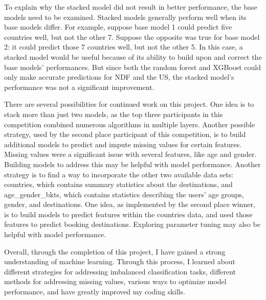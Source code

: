 \documentclass{article}
\begin{document}
To explain why the stacked model did not result in better performance, the base models need to be examined. Stacked models generally perform well when its base models differ. For example, suppose base model 1 could predict five countries well, but not the other 7. Suppose the opposite was true for base model 2: it could predict those 7 countries well, but not the other 5. In this case, a stacked model would be useful because of its ability to build upon and correct the base models' performances. But since both the random forest and XGBoost could only make accurate predictions for NDF and the US, the stacked model's performance was not a significant improvement. 

There are several possibilities for continued work on this project. One idea is to stack more than just two models, as the top three participants in this competition combined numerous algorithms in multiple layers. Another possible strategy, used by the second place participant of this competition, is to build additional models to predict and impute missing values for certain features. Missing values were a significant issue with several features, like age and gender. Building models to address this may be helpful with model performance. Another strategy is to find a way to incorporate the other two available data sets: countries, which contains summary statistics about the destinations, and age\_gender\_bkts, which contains statistics describing the users' age groups, gender, and destinations. One idea, as implemented by the second place winner, is to build models to predict features within the countries data, and used those features to predict booking destinations. Exploring parameter tuning may also be helpful with model performance. 

Overall, through the completion of this project, I have gained a strong understanding of machine learning. Through this process, I learned about different strategies for addressing imbalanced classification tasks, different methods for addressing missing values, various ways to optimize model performance, and have greatly improved my coding skills.





\end{document}
